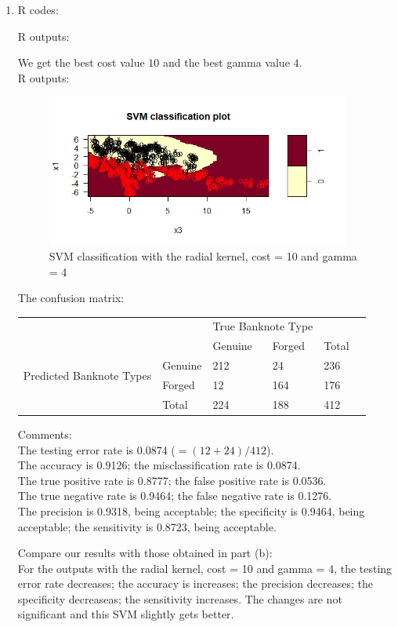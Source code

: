 \documentclass[10pt]{article}
\begin{document}
\begin{enumerate}[1)]
\item
R codes:

R outputs:

We get the best cost value $10$ and the best gamma value $4$.\\
R outputs:
\begin{figure}[H]
  \centering
  \includegraphics[width=10cm,height=5cm]{p43a.jpeg}
  \caption{SVM classification with the radial kernel, cost = 10 and gamma = 4}
\end{figure}

\vspace{3mm}
The confusion matrix:\\
\begin{tabular}{llllll}
                                          &         & \multicolumn{2}{l}{True Banknote Type} &       &  \\
                                          &         & Genuine           & Forged             & Total &  \\
\multirow{2}{*}{Predicted Banknote Types} & Genuine & 212               & 24                 & 236   &  \\
                                          & Forged  & 12                & 164                & 176   &  \\
                                          & Total   & 224               & 188                & 412   &
\end{tabular}
\vspace{3mm}

Comments:\\
The testing error rate is 0.0874 ($=(12+24)/412$).\\
The accuracy is 0.9126; the misclassification rate is 0.0874.\\
The true positive rate is 0.8777; the false positive rate is 0.0536.\\
The true negative rate is 0.9464; the false negative rate is 0.1276.\\
The precision is 0.9318, being acceptable; the specificity is 0.9464, being acceptable; the sensitivity is 0.8723, being acceptable.
\vspace{3mm}

Compare our results with those obtained in part (b):\\
For the outputs with the radial kernel, cost = 10 and gamma = 4, the testing error rate decreases; the accuracy is increases; the precision decreases; the specificity decreaseas; the sensitivity increases. The changes are not significant and this SVM slightly gets better.

\end{enumerate}
\vspace{3mm}
\end{document}
